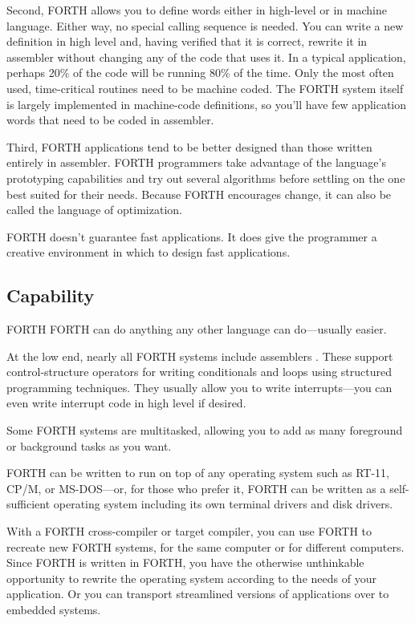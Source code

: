 Second, FORTH allows you to define words either in high-level or in
machine language. Either way, no special calling sequence is needed.
You can write a new definition in high level and, having verified that
it is correct, rewrite it in assembler without changing any of the
code that uses it. In a typical application, perhaps 20\% of the code
will be running 80\% of the time. Only the most often used,
time-critical routines need to be machine coded. The FORTH system
itself is largely implemented in machine-code definitions, so you'll
have few application words that need to be coded in assembler.


Third, FORTH applications tend to be better designed than those
written entirely in assembler. FORTH programmers take advantage of the
language's prototyping capabilities and try out several algorithms
before settling on the one best suited for their needs. Because FORTH
encourages change, it can also be called the language of optimization.

FORTH doesn't guarantee fast applications. It does give the programmer
a creative environment in which to design fast applications.

\subsection{Capability}
FORTH
FORTH
can do anything any other language can do---usually easier.

At the low end, nearly all FORTH systems include assemblers
. These
support control-structure operators for writing conditionals and loops
using structured programming techniques. They usually allow you to
write interrupts---you can even write interrupt code in high level if
desired.

Some FORTH systems are multitasked, allowing you to add as many
foreground or background tasks as you want.

FORTH can be written to run on top of any operating system such as
RT-11, CP/M, or MS-DOS---or, for those who prefer it, FORTH can be
written as a self-sufficient operating system including its own
terminal drivers and disk drivers.

With a FORTH cross-compiler
 or
target compiler,
you can use FORTH to recreate new FORTH systems, for the same computer
or for different computers. Since FORTH is written in FORTH, you have
the otherwise unthinkable opportunity to rewrite the operating system
according to the needs of your application. Or you can transport
streamlined versions of applications over to embedded systems. 


